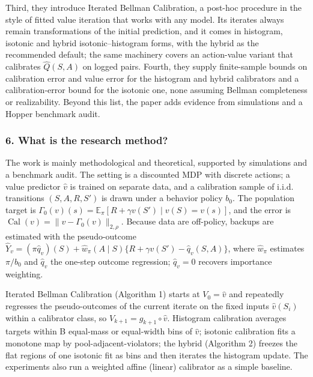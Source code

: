 \documentclass[11pt]{article}
\newcommand{\question}[1]{\subsubsection*{#1}}
\begin{document}
Third, they introduce Iterated Bellman Calibration, a post-hoc procedure in the style of fitted value iteration that works with any model. Its iterates always remain transformations of the initial prediction, and it comes in histogram, isotonic and hybrid isotonic--histogram forms, with the hybrid as the recommended default; the same machinery covers an action-value variant that calibrates $\hat{Q}(S, A)$ on logged pairs. Fourth, they supply finite-sample bounds on calibration error and value error for the histogram and hybrid calibrators and a calibration-error bound for the isotonic one, none assuming Bellman completeness or realizability. Beyond this list, the paper adds evidence from simulations and a Hopper benchmark audit.

\question{6. What is the research method?}

The work is mainly methodological and theoretical, supported by simulations and a benchmark audit. The setting is a discounted MDP with discrete actions; a value predictor $\hat{v}$ is trained on separate data, and a calibration sample of i.i.d. transitions $(S, A, R, S')$ is drawn under a behavior policy $b_{0}$. The population target is $\Gamma_0(v)(s) = \mathbb{E}_\pi[R + \gamma v(S') \mid v(S) = v(s)]$, and the error is $\operatorname{Cal}(v) = \|v - \Gamma_0(v)\|_{2,\rho}$. Because data are off-policy, backups are estimated with the pseudo-outcome $\hat{Y}_v = (\pi \hat{q}_v)(S) + \hat{w}_\pi(A \mid S)\{R + \gamma v(S') - \hat{q}_v(S, A)\}$, where $\hat{w}_\pi$ estimates $\pi/b_0$ and $\hat{q}_v$ the one-step outcome regression; $\hat{q}_v = 0$ recovers importance weighting.

Iterated Bellman Calibration (Algorithm 1) starts at $V_0 = \hat{v}$ and repeatedly regresses the pseudo-outcomes of the current iterate on the fixed inputs $\hat{v}(S_i)$ within a calibrator class, so $V_{k+1} = g_{k+1} \circ \hat{v}$. Histogram calibration averages targets within B equal-mass or equal-width bins of $\hat{v}$; isotonic calibration fits a monotone map by pool-adjacent-violators; the hybrid (Algorithm 2) freezes the flat regions of one isotonic fit as bins and then iterates the histogram update. The experiments also run a weighted affine (linear) calibrator as a simple baseline.
\end{document}
